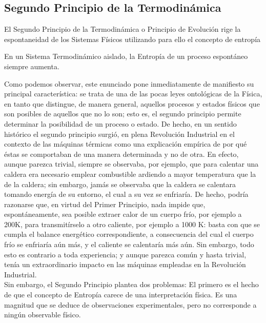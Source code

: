\subsection{Segundo Principio de la Termodinámica}

El Segundo Principio de la Termodinámica o Principio de Evolución rige la espontaneidad de los Sistemas Físicos utilizando para ello el concepto de entropía\\

\begin{definition}
	En un Sistema Termodinámico aislado, la Entropía de un proceso espontáneo siempre aumenta.
\end{definition}

Como podemos observar, este enunciado pone inmediatamente de manifiesto su principal característica: se trata de una de las pocas leyes ontológicas de la Física, en tanto que distingue, de manera general, aquellos procesos y estados físicos que son posibles de aquellos que no lo son; esto es, el segundo principio permite determinar la posibilidad de un proceso o estado. De hecho, en un sentido histórico el segundo principio surgió, en plena Revolución Industrial en el contexto de las máquinas térmicas como una explicación empírica de por qué éstas se comportaban de una manera determinada y no de otra. En efecto, aunque parezca trivial, siempre se observaba, por ejemplo, que para calentar una caldera era necesario emplear combustible ardiendo a mayor temperatura que la de la caldera; sin embargo, jamás se observaba que la caldera se calentara tomando energía de su entorno, el cual a su vez se enfriaría. De hecho, podría razonarse que, en virtud del Primer Principio, nada impide que, espontáneamente, sea posible extraer calor de un cuerpo frío, por ejemplo a 200K, para transmitírselo a otro caliente, por ejemplo a 1000 K: basta con que se cumpla el balance energético correspondiente, a consecuencia del cual el cuerpo frío se enfriaría aún más, y el caliente se calentaría más aún. Sin embargo, todo esto es contrario a toda experiencia; y aunque parezca común y hasta trivial, tenía un extraordinario impacto en las máquinas empleadas en la Revolución Industrial.\\

Sin embargo, el Segundo Principio plantea dos problemas: El primero es el hecho de que el concepto de Entropía carece de una interpretación física. Es una magnitud que se deduce de observaciones experimentales, pero no corresponde a ningún observable físico.\\

